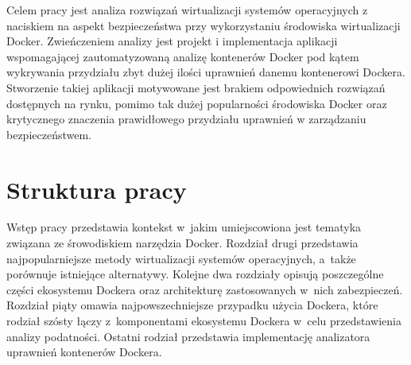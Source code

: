 Celem pracy jest analiza rozwiązań wirtualizacji systemów operacyjnych z naciskiem na aspekt bezpieczeństwa przy wykorzystaniu środowiska wirtualizacji Docker. Zwieńczeniem analizy jest projekt i implementacja aplikacji wspomagającej zautomatyzowaną analizę kontenerów Docker pod kątem wykrywania przydziału zbyt dużej ilości uprawnień danemu kontenerowi Dockera. Stworzenie takiej aplikacji motywowane jest brakiem odpowiednich rozwiązań dostępnych na rynku, pomimo tak dużej popularności środowiska Docker oraz krytycznego znaczenia prawidłowego przydziału uprawnień w zarządzaniu bezpieczeństwem.

\section{Struktura pracy}

Wstęp pracy przedstawia kontekst w~jakim umiejscowiona jest tematyka związana ze śrowodiskiem narzędzia Docker. Rozdział drugi przedstawia najpopularniejsze metody wirtualizacji systemów operacyjnych, a~także porównuje istniejące alternatywy. Kolejne dwa rozdziały opisują poszczególne części ekosystemu Dockera oraz architekturę zastosowanych w~nich zabezpieczeń. Rozdział piąty omawia najpowszechniejsze przypadku użycia Dockera, które rodział szósty łączy z~komponentami ekosystemu Dockera w~celu przedstawienia analizy podatności. Ostatni rodział przedstawia implementację analizatora uprawnień kontenerów Dockera.
